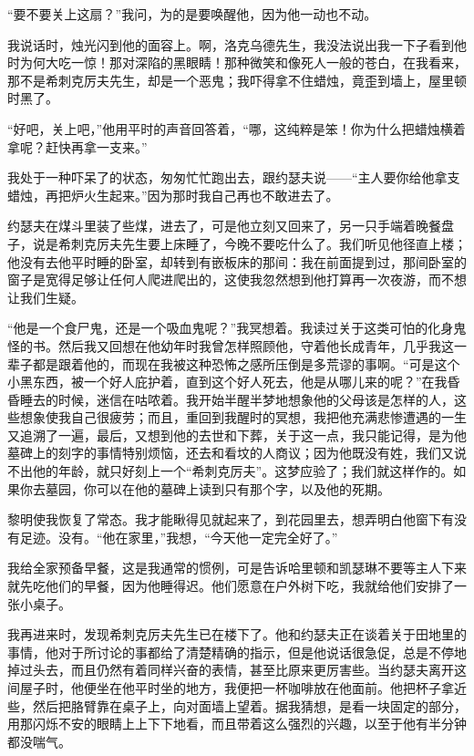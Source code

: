 \par “要不要关上这扇？”我问，为的是要唤醒他，因为他一动也不动。
\par 我说话时，烛光闪到他的面容上。啊，洛克乌德先生，我没法说出我一下子看到他时为何大吃一惊！那对深陷的黑眼睛！那种微笑和像死人一般的苍白，在我看来，那不是希刺克厉夫先生，却是一个恶鬼；我吓得拿不住蜡烛，竟歪到墙上，屋里顿时黑了。
\par “好吧，关上吧，”他用平时的声音回答着，“哪，这纯粹是笨！你为什么把蜡烛横着拿呢？赶快再拿一支来。”
\par 我处于一种吓呆了的状态，匆匆忙忙跑出去，跟约瑟夫说——“主人要你给他拿支蜡烛，再把炉火生起来。”因为那时我自己再也不敢进去了。
\par 约瑟夫在煤斗里装了些煤，进去了，可是他立刻又回来了，另一只手端着晚餐盘子，说是希刺克厉夫先生要上床睡了，今晚不要吃什么了。我们听见他径直上楼；他没有去他平时睡的卧室，却转到有嵌板床的那间：我在前面提到过，那间卧室的窗子是宽得足够让任何人爬进爬出的，这使我忽然想到他打算再一次夜游，而不想让我们生疑。
\par “他是一个食尸鬼，还是一个吸血鬼呢？”我冥想着。我读过关于这类可怕的化身鬼怪的书。然后我又回想在他幼年时我曾怎样照顾他，守着他长成青年，几乎我这一辈子都是跟着他的，而现在我被这种恐怖之感所压倒是多荒谬的事啊。“可是这个小黑东西，被一个好人庇护着，直到这个好人死去，他是从哪儿来的呢？”在我昏昏睡去的时候，迷信在咕哝着。我开始半醒半梦地想象他的父母该是怎样的人，这些想象使我自己很疲劳；而且，重回到我醒时的冥想，我把他充满悲惨遭遇的一生又追溯了一遍，最后，又想到他的去世和下葬，关于这一点，我只能记得，是为他墓碑上的刻字的事情特别烦恼，还去和看坟的人商议；因为他既没有姓，我们又说不出他的年龄，就只好刻上一个“希刺克厉夫”。这梦应验了；我们就这样作的。如果你去墓园，你可以在他的墓碑上读到只有那个字，以及他的死期。
\par 黎明使我恢复了常态。我才能瞅得见就起来了，到花园里去，想弄明白他窗下有没有足迹。没有。“他在家里，”我想，“今天他一定完全好了。”
\par 我给全家预备早餐，这是我通常的惯例，可是告诉哈里顿和凯瑟琳不要等主人下来就先吃他们的早餐，因为他睡得迟。他们愿意在户外树下吃，我就给他们安排了一张小桌子。
\par 我再进来时，发现希刺克厉夫先生已在楼下了。他和约瑟夫正在谈着关于田地里的事情，他对于所讨论的事都给了清楚精确的指示，但是他说话很急促，总是不停地掉过头去，而且仍然有着同样兴奋的表情，甚至比原来更厉害些。当约瑟夫离开这间屋子时，他便坐在他平时坐的地方，我便把一杯咖啡放在他面前。他把杯子拿近些，然后把胳臂靠在桌子上，向对面墙上望着。据我猜想，是看一块固定的部分，用那闪烁不安的眼睛上上下下地看，而且带着这么强烈的兴趣，以至于他有半分钟都没喘气。
